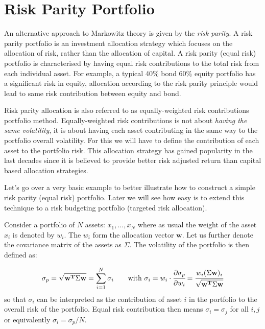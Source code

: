 \section{Risk Parity Portfolio}\label{risk-parity-portfolio}

An alternative approach to Markowitz theory is given by the
\emph{risk parity}. A risk parity portfolio is an investment allocation
strategy which focuses on the allocation of risk, rather than the
allocation of capital. A risk parity (equal risk) portfolio is
characterised by having equal risk contributions to the total risk from
each individual asset. For example, a typical 40\% bond 60\% equity
portfolio has a significant risk in equity, allocation according to the
risk parity principle would lead to same risk contribution between
equity and bond.

Risk parity allocation is also referred to as equally-weighted risk
contributions portfolio method. Equally-weighted risk contributions is
not about \emph{having the same volatility}, it is about having each
asset contributing in the same way to the portfolio overall volatility.
For this we will have to define the contribution of each asset to the
portfolio risk. This allocation strategy has gained popularity in the
last decades since it is believed to provide better risk adjusted return
than capital based allocation strategies.

Let's go over a very basic example to better illustrate how to construct
a simple risk parity (equal risk) portfolio. Later we will see how easy
is to extend this technique to a risk budgeting portfolio (targeted risk
allocation).

Consider a portfolio of \(N\) assets: \(x_{1}, \ldots, x_N\) where as
usual the weight of the asset \(x_{i}\) is denoted by \(w_{i}\). The
\(w_{i}\) form the allocation vector \(\mathbf{w}\). Let us further
denote the covariance matrix of the assets as \(\Sigma\). The volatility
of the portfolio is then defined as:

\[ \sigma_p={\sqrt {\mathbf{w^T}\Sigma \mathbf{w}}} = \sum _{i=1}^{N}\sigma _{i}~~~~~~\textrm{with}~\sigma _{i} = w_{i}\cdot \cfrac{\partial\sigma_p}{\partial w_{i}}={\cfrac {w_{i}(\Sigma \mathbf{w})_{i}}{\sqrt {\mathbf{w^T}\Sigma \mathbf{w}}}}\]
so that \(\sigma _{i}\) can be interpreted as the contribution of asset
\(i\) in the portfolio to the overall risk of the portfolio.
Equal risk contribution then means \(\sigma _{i} =\sigma _{j}\) for all
\(i,j\) or equivalently \(\sigma _{i}=\sigma_p/N\).


